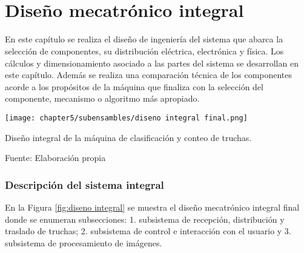 
\pagestyle{myportland}
\doublespacing
\chapter[\quad\quad\quad\quad ----- Diseño mecatrónico integral]{\\ Diseño mecatrónico integral}
\thispagestyle{myportland}


En este capítulo se realiza el diseño de ingeniería del sistema que abarca la selección de componentes, su distribución eléctrica, electrónica y física. Los cálculos y dimensionamiento asociado a las partes del sistema se desarrollan en este capítulo. Además se realiza una comparación técnica de los componentes acorde a los propósitos de la máquina que finaliza con la selección del componente, mecanismo o algoritmo más apropiado.

\begin{myfigure}[H]
	\footnotesize\centering
	\texttt{[image: chapter5/subensambles/diseno integral final.png]}
	\caption{Diseño integral de la máquina de clasificación y conteo de truchas.}
	\begin{myflushcenter}
		Fuente: Elaboración propia
	\end{myflushcenter}
	\label{fig:diseno integral}
\end{myfigure}

\subsection{Descripción del sistema integral}
\label{ssec:descripcion del sistema integral}

En la Figura \ref{fig:diseno integral} se muestra el diseño mecatrónico integral final donde se enumeran subsecciones: 1. subsistema de recepción, distribución y traslado de truchas; 2. subsistema de control e interacción con el usuario y 3. subsistema de procesamiento de imágenes.

